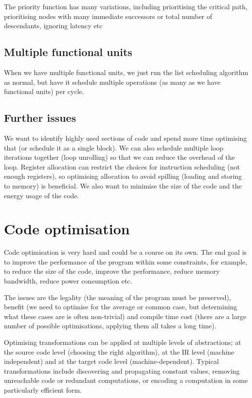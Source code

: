 The priority function has many variations, including prioritising the
critical path, prioritising nodes with many immediate successors or
total number of descendants, ignoring latency etc

\subsection{Multiple functional units}

When we have multiple functional units, we just run the list
scheduling algorithm as normal, but have it schedule multiple
operations (as many as we have functional units) per cycle.


\subsection{Further issues}

We want to identify highly used sections of code and spend more time
optimising that (or schedule it as a single block). We can also
schedule multiple loop iterations together (loop unrolling) so that we
can reduce the overhead of the loop. Register allocation can restrict
the choices for instruction scheduling (not enough registers), so
optimising allocation to avoid spilling (loading and storing to
memory) is beneficial. We also want to minimise the size of the code
and the energy usage of the code.


\section{Code optimisation}

Code optimisation is very hard and could be a course on its own. The
end goal is to improve the performance of the program within some
constraints, for example, to reduce the size of the code, improve the
performance, reduce memory bandwidth, reduce power consumption etc.

The issues are the legality (the meaning of the program must be
preserved), benefit (we need to optimise for the average or common
case, but determining what these cases are is often non-trivial) and
compile time cost (there are a large number of possible optimisations,
applying them all takes a long time).

Optimising transformations can be applied at multiple levels of
abstractions; at the source code level (choosing the right algorithm),
at the IR level (machine independent) and at the target code level
(machine-dependent). Typical transformations include discovering and
propagating constant values, removing unreachable code or redundant
computations, or encoding a computation in some particularly efficient
form.

